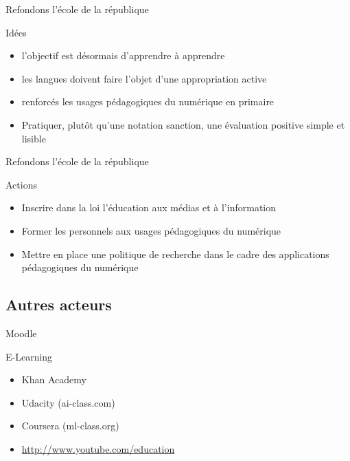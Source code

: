 \begin{frame}{Refondons l'école de la république}

\begin{block}{Idées}
  \begin{itemize}
    \item l’objectif est désormais d’apprendre à apprendre
    \item les langues doivent faire l’objet d’une appropriation active
    \item renforcés les usages pédagogiques du numérique en primaire
   \item Pratiquer, plutôt qu’une notation sanction, une évaluation positive simple et lisible
  \end{itemize}
\end{block}
\end{frame}

\begin{frame}{Refondons l'école de la république}
\begin{block}{Actions}
\begin{itemize}
  \item Inscrire dans la loi l’éducation aux médias et à l’information 
  \item Former les personnels aux usages pédagogiques du numérique
  \item Mettre en place une politique de recherche dans le cadre des applications
pédagogiques du numérique
\end{itemize} 
\end{block}


\end{frame}

\subsection{Autres acteurs}

\begin{frame}{Moodle}
\end{frame}

\begin{frame}{E-Learning}

\begin{itemize}
\item Khan Academy
\item Udacity (ai-class.com)
\item Coursera (ml-class.org)
\item \url{http://www.youtube.com/education}
\end{itemize}

\end{frame}

